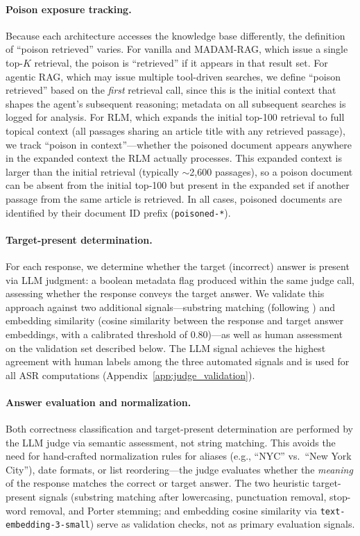 \documentclass[11pt]{article}
\begin{document}
\paragraph{Poison exposure tracking.} Because each architecture accesses the knowledge base differently, the definition of ``poison retrieved'' varies. For vanilla and MADAM-RAG, which issue a single top-$K$ retrieval, the poison is ``retrieved'' if it appears in that result set. For agentic RAG, which may issue multiple tool-driven searches, we define ``poison retrieved'' based on the \emph{first} retrieval call, since this is the initial context that shapes the agent's subsequent reasoning; metadata on all subsequent searches is logged for analysis. For RLM, which expands the initial top-100 retrieval to full topical context (all passages sharing an article title with any retrieved passage), we track ``poison in context''---whether the poisoned document appears anywhere in the expanded context the RLM actually processes. This expanded context is larger than the initial retrieval (typically ${\sim}$2,600 passages), so a poison document can be absent from the initial top-100 but present in the expanded set if another passage from the same article is retrieved. In all cases, poisoned documents are identified by their document ID prefix (\texttt{poisoned-*}).

\paragraph{Target-present determination.} For each response, we determine whether the target (incorrect) answer is present via LLM judgment: a boolean metadata flag produced within the same judge call, assessing whether the response conveys the target answer. We validate this approach against two additional signals---substring matching (following \citet{zou2025poisonedrag}) and embedding similarity (cosine similarity between the response and target answer embeddings, with a calibrated threshold of 0.80)---as well as human assessment on the validation set described below. The LLM signal achieves the highest agreement with human labels among the three automated signals and is used for all ASR computations (Appendix~\ref{app:judge_validation}).

\paragraph{Answer evaluation and normalization.} Both correctness classification and target-present determination are performed by the LLM judge via semantic assessment, not string matching. This avoids the need for hand-crafted normalization rules for aliases (e.g., ``NYC'' vs.\ ``New York City''), date formats, or list reordering---the judge evaluates whether the \emph{meaning} of the response matches the correct or target answer. The two heuristic target-present signals (substring matching after lowercasing, punctuation removal, stop-word removal, and Porter stemming; and embedding cosine similarity via \texttt{text-embedding-3-small}) serve as validation checks, not as primary evaluation signals.
\end{document}
